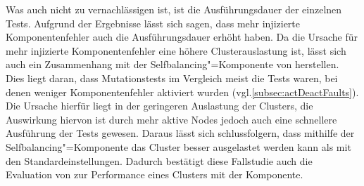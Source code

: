 Was auch nicht zu vernachlässigen ist, ist die Ausführungsdauer der einzelnen Tests.
Aufgrund der Ergebnisse lässt sich sagen, dass mehr injizierte Komponentenfehler auch die Ausführungsdauer erhöht haben.
Da die Ursache für mehr injizierte Komponentenfehler eine höhere Clusterauslastung ist, lässt sich auch ein Zusammenhang mit der Selfbalancing"=Komponente von \citeauthor{Zhang2016} herstellen.
Dies liegt daran, dass Mutationstests im Vergleich meist die Tests waren, bei denen weniger Komponentenfehler aktiviert wurden (vgl.\cref{subsec:actDeactFaults}).
Die Ursache hierfür liegt in der geringeren Auslastung der Clusters, die Auswirkung hiervon ist durch mehr aktive Nodes jedoch auch eine schnellere Ausführung der Tests gewesen.
Daraus lässt sich schlussfolgern, dass mithilfe der Selfbalancing"=Komponente das Cluster besser ausgelastet werden kann als mit den Standardeinstellungen.
Dadurch bestätigt diese Fallstudie auch die Evaluation von \citeauthor{Zhang2016} \cite{Zhang2016} zur Performance eines Clusters mit der Komponente.
